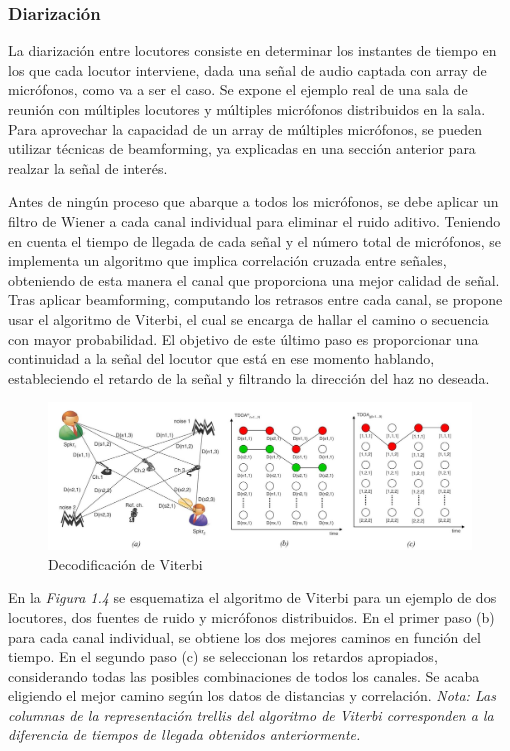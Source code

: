 \documentclass[a4paper,11pt]{book}
\begin{document}
			\subsubsection{Diarización}
			La diarización entre locutores consiste en determinar los instantes de tiempo en los que cada locutor interviene, dada una señal de audio captada con array de micrófonos, como va a ser el caso. Se expone el ejemplo real de una sala de reunión con múltiples locutores y múltiples micrófonos distribuidos en la sala. Para aprovechar la capacidad de un array de múltiples micrófonos, se pueden utilizar técnicas de beamforming, ya explicadas en una sección anterior para realzar la señal de interés.
			
			Antes de ningún proceso que abarque a todos los micrófonos, se debe aplicar un filtro de Wiener a cada canal individual para eliminar el ruido aditivo. Teniendo en cuenta el tiempo de llegada de cada señal y el número total de micrófonos, se implementa un algoritmo que implica correlación cruzada entre señales, obteniendo de esta manera el canal que proporciona una mejor calidad de señal. Tras aplicar beamforming, computando los retrasos entre cada canal, se propone usar el algoritmo de Viterbi, el cual se encarga de hallar el camino o secuencia con mayor probabilidad. El objetivo de este último paso es proporcionar una continuidad a la señal del locutor que está en ese momento hablando, estableciendo el retardo de la señal y filtrando la dirección del haz no deseada.	
			\begin{figure}[hbtp]
			\centering
			\includegraphics[width = 13cm]{FIGURAS/diarizacion.JPG}
			\caption{Decodificación de Viterbi}
			\end{figure}	
			
			En la \textit{Figura 1.4} se esquematiza el algoritmo de Viterbi para un ejemplo de dos locutores, dos fuentes de ruido y micrófonos distribuidos. En el primer paso (b) para cada canal individual, se obtiene los dos mejores caminos en función del tiempo. En el segundo paso (c) se seleccionan los retardos apropiados, considerando todas las posibles combinaciones de todos los canales. Se acaba eligiendo el mejor camino según los datos de distancias y correlación.\linebreak 
			\textit{Nota: Las columnas de la representación trellis del algoritmo de Viterbi corresponden a la diferencia de tiempos de llegada obtenidos anteriormente.
}
\end{document}
